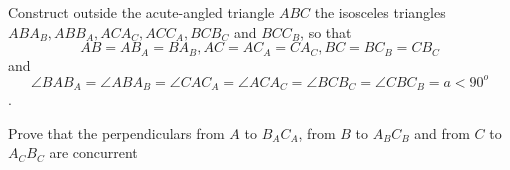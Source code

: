 Construct outside the acute-angled triangle $ABC$ the isosceles triangles $ABA_B, ABB_A , ACA_C,ACC_A ,BCB_C$ and $BCC_B$,  so that $$AB = AB_A = BA_B, AC = AC_A=CA_C, BC = BC_B = CB_C$$and $$\angle BAB_A = \angle ABA_B =\angle CAC_A=\angle ACA_C= \angle BCB_C =\angle CBC_B = a < 90^o$$.

Prove that the perpendiculars from $A$ to $B_AC_A$,  from $B$ to $A_BC_B$ and from $C$ to $A_CB_C$ are concurrent